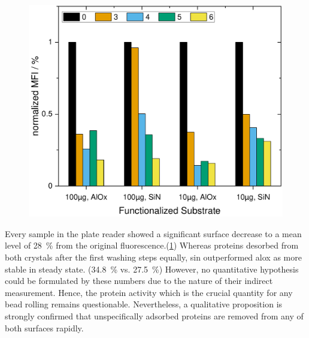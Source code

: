 \begin{figure}[h!]
	\centering
	\includegraphics[width=.7\linewidth]{Ressources/ResultPlots/SurfaceFuncSiNAlOx}
	\label{fig:unsp:wash}
\end{figure}
Every sample in the plate reader showed a significant surface decrease to a mean level of \SI{28}{\percent} from the original fluorescence.(\cref{fig:unsp:wash}) Whereas proteins desorbed from both crystals after the first washing steps equally, \gls{sin} outperformed \gls{alox} as more stable in steady state. (\SI{34.8}{\percent} vs. \SI{27.5}{\percent}) However, no quantitative hypothesis could be formulated by these numbers due to the nature of their indirect measurement. Hence, the protein activity which is the crucial quantity for any bead rolling remains questionable. Nevertheless, a qualitative proposition is strongly confirmed that unspecifically adsorbed proteins are removed from any of both surfaces rapidly.


